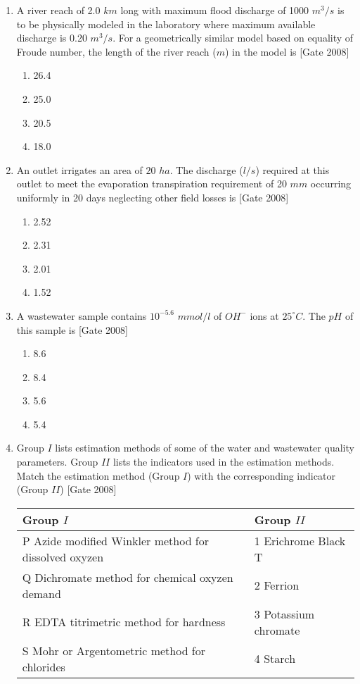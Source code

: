\documentclass[journal]{IEEEtran}
\begin{document}
\begin{enumerate}
	\item A river reach of 2.0 $km$ long with maximum flood discharge of 1000 $m^3/s$ is to be physically modeled in the laboratory where maximum available discharge is 0.20 $m^3/s$. For 
a geometrically similar model based on equality of Froude number, the length of the river reach ($m$) in the model is \hfill [Gate 2008]
\begin{multicols}{4}
	\begin{enumerate}
		\item 26.4
		\item 25.0
		\item 20.5
		\item 18.0
	\end{enumerate}
\end{multicols}
	\item An outlet irrigates an area of $20$ $ha$. The discharge ($l/s$) required at this outlet to meet the evaporation transpiration requirement of 20 $mm$ occurring uniformly in 20 days neglecting other field losses is \hfill [Gate 2008]
		\begin{multicols}{4}
	\begin{enumerate}
		\item 2.52
		\item 2.31
		\item 2.01
		\item 1.52
	\end{enumerate}
\end{multicols}
	\item A wastewater sample contains $10^{-5.6}$ $mmol/l$ of $OH^{-}$ ions at $25 ^{\circ}C$. The $pH$ of this sample is
		\hfill [Gate 2008]
		\begin{multicols}{4}
	\begin{enumerate}
		\item 8.6
		\item 8.4
		\item 5.6
		\item 5.4
	\end{enumerate}
\end{multicols}
	\item Group $I$ lists estimation methods of some of the water and wastewater quality parameters. Group $II$ lists the indicators used in the estimation methods. Match the estimation method (Group $I$) with the corresponding indicator (Group $II$) \hfill [Gate 2008]
\begin{center}
		
\begin{tabular}{ |l| l|}
\hline
Group $I$ &  Group $II$ \\ 
\hline
P Azide modified Winkler method for dissolved oxyzen & 1 Erichrome Black T \\
\hline
Q Dichromate method for chemical oxyzen demand & 2 Ferrion \\
\hline
R EDTA titrimetric method for hardness & 3 Potassium chromate  \\
\hline
S Mohr or Argentometric method for chlorides &  4 Starch \\
\hline



\end{tabular}
\end{center}
\end{enumerate}
\end{document}
